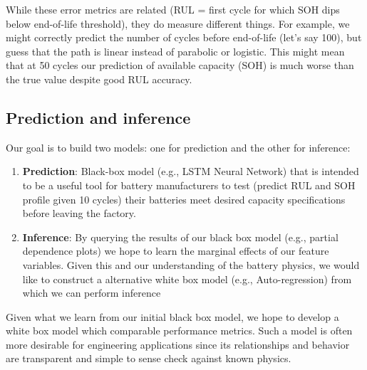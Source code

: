 While these error metrics are related (RUL = first cycle for which SOH dips below end-of-life threshold), they do measure different things. For example, we might correctly predict the number of cycles before end-of-life (let's say 100), but guess that the path is linear instead of parabolic or logistic. This might mean that at 50 cycles our prediction of available capacity (SOH) is much worse than the true value despite good RUL accuracy. 

\subsection{Prediction and inference}

Our goal is to build two models: one for prediction and the other for inference:
\begin{enumerate}
    \item \textbf{Prediction}: Black-box model (e.g., LSTM Neural Network) that is intended to be a useful tool for battery manufacturers to test (predict RUL and SOH profile given 10 cycles) their batteries meet desired capacity specifications before leaving the factory. 
    \item \textbf{Inference}: By querying the results of our black box model (e.g., partial dependence plots) we hope to learn the marginal effects of our feature variables. Given this and our understanding of the battery physics, we would like to construct a alternative white box model (e.g., Auto-regression) from which we can perform inference
\end{enumerate}

Given what we learn from our initial black box model, we hope to develop a white box model which comparable performance metrics. Such a model is often more desirable for engineering applications since its relationships and behavior are transparent and simple to sense check against known physics.








